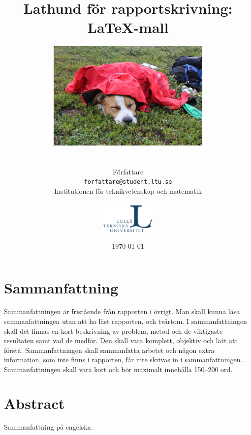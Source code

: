 \documentclass[a4paper]{article}
\title{Lathund för rapportskrivning:\\
\LaTeX -mall}
\author{\includegraphics[width=0.6\textwidth]{hund_liten.jpg} \\ \\ \\
Författare \\
{\tt forfattare@student.ltu.se} \\
Institutionen för teknikvetenskap och matematik \\ \\
\includegraphics[width=0.2\textwidth]{ltu_swe.jpg}}
\date{\today}
\begin{document}
\maketitle
\thispagestyle{empty}


\newpage
{}
\section*{Sammanfattning}

Sammanfattningen är fristående från rapporten i övrigt. Man skall kunna läsa sammanfattningen utan att ha läst rapporten, och tvärtom. I sammanfattningen skall det finnas en kort beskrivning av problem, metod och de viktigaste resultaten samt vad de medför. Den skall vara komplett, objektiv och lätt att förstå. Sammanfattningen skall sammanfatta arbetet och någon extra information, som inte finns i rapporten, får inte skrivas in i sammanfattningen. Sammanfattningen skall vara kort och bör maximalt innehålla \numrange{150}{200}{} ord.


\section*{Abstract}

Sammanfattning på engelska.


\newpage
\tableofcontents

%
%
%
\end{document}
